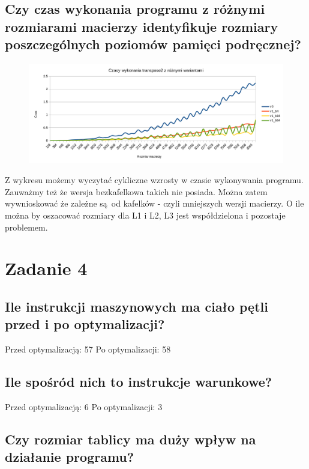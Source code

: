 \documentclass[a4paper,12pt]{mwart} %
\begin{document}
\subsection*{Czy czas wykonania programu z różnymi rozmiarami macierzy identyfikuje rozmiary poszczególnych poziomów pamięci podręcznej?}

\begin{figure}[h!]
  \includegraphics[width=\linewidth]{graphs/graph3-2.png}
\end{figure}

Z wykresu możemy wyczytać cykliczne wzrosty w czasie wykonywania programu. Zauważmy też że wersja bezkafelkowa takich nie posiada. Można zatem wywnioskować że zależne są od kafelków - czyli mniejszych wersji macierzy. O ile można by oszacować rozmiary dla L1 i L2, L3 jest współdzielona i pozostaje problemem.

\section*{Zadanie 4}


\subsection*{Ile instrukcji maszynowych ma ciało pętli przed i po optymalizacji?}

Przed optymalizacją: 57
Po optymalizacji: 58

\subsection*{Ile spośród nich to instrukcje warunkowe?}

Przed optymalizacją: 6
Po optymalizacji: 3

\subsection*{Czy rozmiar tablicy ma duży wpływ na działanie programu?}
\end{document}
